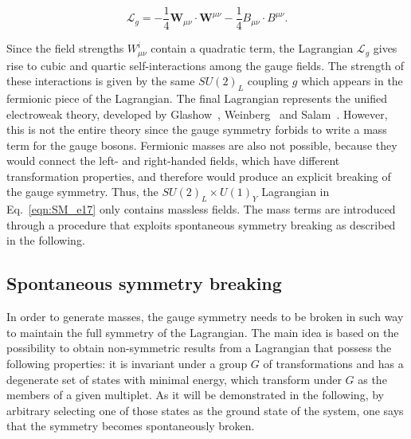\begin{equation}\label{eqn:SM_e20}
\mathcal{L}_g = -\frac{1}{4}\textbf{W}_{\mu\nu} \cdot \textbf{W}^{\mu\nu} - \frac{1}{4}B_{\mu\nu} \cdot B^{\mu\nu}.
\end{equation}

Since the field strengths $W^i_{\mu\nu}$ contain a quadratic term, the Lagrangian $\mathcal{L}_g$ gives rise to cubic and quartic self-interactions among the gauge fields.
The strength of these interactions is given by the same $SU(2)_L$ coupling $g$ which appears in the fermionic piece of the Lagrangian.
The final Lagrangian represents the unified electroweak theory, developed by Glashow~\cite{GLASHOW1961579}, Weinberg~\cite{PhysRevLett.19.1264} and Salam~\cite{RevModPhys.52.525}.
However, this is not the entire theory since the gauge symmetry forbids to write a mass term for the gauge bosons.
Fermionic masses are also not possible, because they would connect the left- and right-handed fields, which have different transformation properties, and therefore would produce an explicit breaking of the gauge symmetry.
Thus, the $SU(2)_L\times U(1)_Y$ Lagrangian in Eq.~\ref{eqn:SM_e17} only contains massless fields.
The mass terms are introduced through a procedure that exploits spontaneous symmetry breaking as described in the following.

\subsection{Spontaneous symmetry breaking}\label{subsec:EWSB}

In order to generate masses, the gauge symmetry needs to be broken in such way to maintain the full symmetry of the Lagrangian.
The main idea is based on the possibility to obtain non-symmetric results from a Lagrangian that possess the following properties:
it is invariant under a group $G$ of transformations and has a degenerate set of states with minimal energy, which transform under $G$ as the members of a given multiplet.
As it will be demonstrated in the following, by arbitrary selecting one of those states as the ground state of the system, one says that the symmetry becomes spontaneously broken.

